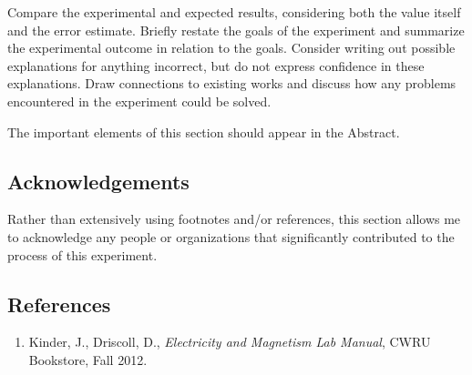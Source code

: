 \documentclass[letterpaper, 12pt]{article}
\begin{document}
		Compare the experimental and expected results, considering both the value itself and the error estimate. Briefly restate the goals of the experiment and summarize the experimental outcome in relation to the goals. Consider writing out possible explanations for anything incorrect, but do not express confidence in these explanations. Draw connections to existing works and discuss how any problems encountered in the experiment could be solved.
		
		The important elements of this section should appear in the Abstract.
	
	\subsection*{Acknowledgements}
	
		Rather than extensively using footnotes and/or references, this section allows me to acknowledge any people or organizations that significantly contributed to the process of this experiment.
	
	\subsection*{References}
	\begin{enumerate}
		\item Kinder, J., Driscoll, D., \textit{Electricity and Magnetism Lab Manual}, CWRU Bookstore, Fall 2012.
	\end{enumerate}
\end{document}
